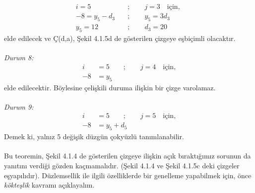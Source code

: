 \documentclass{amsbook}
\begin{document}
\chapter{}
\begin{align*}
i=5 \qquad &; \qquad j=3 \quad \text{için, }\\
-8=y_{5}-d_{3} \quad &; \qquad y_{5} = 3d_{3}\\
y_{5}=12 \qquad &; \qquad d_{3}=20
\end{align*}
elde edilecek ve Ç(d,a), Şekil 4.1.5d de gösterilen çizgeye eşbiçimli olacaktır.\\\\
\textit{Durum 8:}\\
\begin{align*}
i&=5 \qquad ; \qquad j=4 \quad \text{için,}\\
-8&=y_{5}
\end{align*}
elde edilecektir. Böylesine çelişkili duruma ilişkin bir çizge varolamaz.\\\\
\textit{Durum 9:}\\
\begin{align*}
i&=5 \qquad ; \qquad j=5 \quad \text{için,}\\
-8&=y_{5}+d_{5}
\end{align*}
Demek ki, yalnız 5 değişik düzgün çokyüzlü tanımlanabilir.\\\\
Bu teoremin, Şekil 4.1.4 de gösterilen çizgeye ilişkin açık bıraktığımız sorunun da yanıtını verdiği gözden kaçmamalıdır. (Şekil 4.1.4 ve Şekil 4.1.5c deki çizgeler eşyapılıdır). Düzlemsellik ile ilgili özelliklerde bir genelleme yapabilmek için, önce \textit{kökteşlik} kavramı açıklayalım. 

\end{document}
